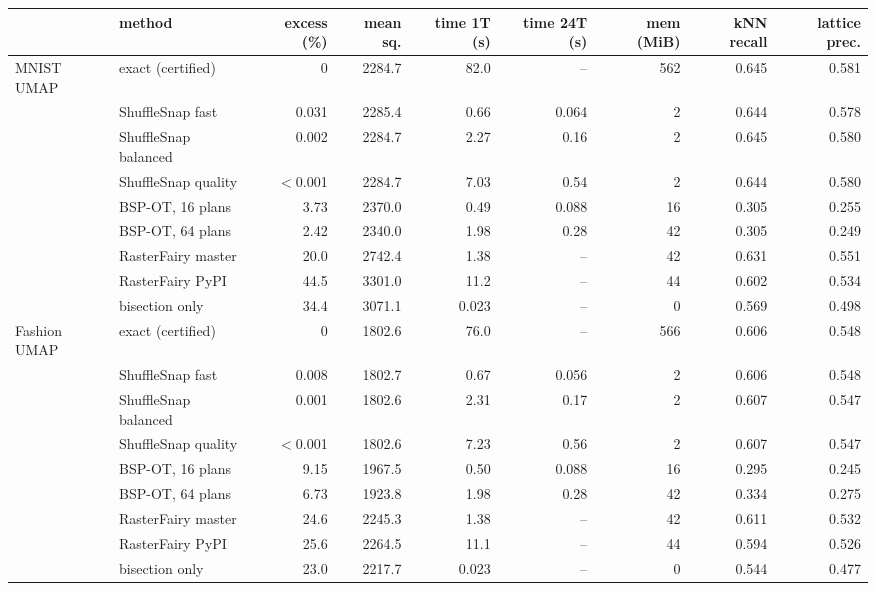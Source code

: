 \begin{tabular}{llrrrrrrr}
\toprule
 & method & excess (\%) & mean sq. & time 1T (s) & time 24T (s) & mem (MiB) & kNN recall & lattice prec. \\
\midrule
MNIST UMAP & exact (certified) & 0 & 2284.7 & 82.0 & -- & 562 & 0.645 & 0.581 \\
 & ShuffleSnap fast & 0.031 & 2285.4 & 0.66 & 0.064 & 2 & 0.644 & 0.578 \\
 & ShuffleSnap balanced & 0.002 & 2284.7 & 2.27 & 0.16 & 2 & 0.645 & 0.580 \\
 & ShuffleSnap quality & $<$0.001 & 2284.7 & 7.03 & 0.54 & 2 & 0.644 & 0.580 \\
 & BSP-OT, 16 plans & 3.73 & 2370.0 & 0.49 & 0.088 & 16 & 0.305 & 0.255 \\
 & BSP-OT, 64 plans & 2.42 & 2340.0 & 1.98 & 0.28 & 42 & 0.305 & 0.249 \\
 & RasterFairy master & 20.0 & 2742.4 & 1.38 & -- & 42 & 0.631 & 0.551 \\
 & RasterFairy PyPI & 44.5 & 3301.0 & 11.2 & -- & 44 & 0.602 & 0.534 \\
 & bisection only & 34.4 & 3071.1 & 0.023 & -- & 0 & 0.569 & 0.498 \\
\addlinespace
Fashion UMAP & exact (certified) & 0 & 1802.6 & 76.0 & -- & 566 & 0.606 & 0.548 \\
 & ShuffleSnap fast & 0.008 & 1802.7 & 0.67 & 0.056 & 2 & 0.606 & 0.548 \\
 & ShuffleSnap balanced & 0.001 & 1802.6 & 2.31 & 0.17 & 2 & 0.607 & 0.547 \\
 & ShuffleSnap quality & $<$0.001 & 1802.6 & 7.23 & 0.56 & 2 & 0.607 & 0.547 \\
 & BSP-OT, 16 plans & 9.15 & 1967.5 & 0.50 & 0.088 & 16 & 0.295 & 0.245 \\
 & BSP-OT, 64 plans & 6.73 & 1923.8 & 1.98 & 0.28 & 42 & 0.334 & 0.275 \\
 & RasterFairy master & 24.6 & 2245.3 & 1.38 & -- & 42 & 0.611 & 0.532 \\
 & RasterFairy PyPI & 25.6 & 2264.5 & 11.1 & -- & 44 & 0.594 & 0.526 \\
 & bisection only & 23.0 & 2217.7 & 0.023 & -- & 0 & 0.544 & 0.477 \\
\bottomrule
\end{tabular}
